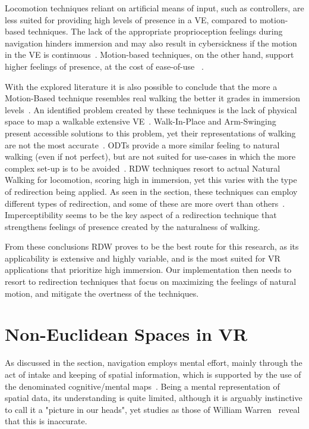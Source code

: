 Locomotion techniques reliant on artificial means of input, such as controllers, are less suited 
for providing high levels of presence in a \gls{VE}, compared to motion-based techniques. 
The lack of the appropriate proprioception feelings during navigation hinders 
immersion and may also result in cybersickness if the motion in the \gls{VE} is continuous~\cite{Langbehn2018, Nasiri2023}. 
Motion-based techniques, on the other hand, support higher feelings of presence, at the cost of ease-of-use 
~\cite{Boletsis2019, Cherni2020, 8255772, Nilsson2018, Syamil2024}. 

With the explored literature it is also possible to conclude that the more a Motion-Based technique resembles real walking the better it grades 
in immersion levels~\cite{Syamil2024}. An identified problem created by these techniques is the lack of physical space to map a walkable extensive 
\gls{VE}~\cite{Cherni2020, 8255772, Nilsson2018}. Walk-In-Place and Arm-Swinging present accessible solutions to
this problem, yet their representations of walking are not the most accurate~\cite{Cherni2020, Nilsson2018}. 
\glspl{ODT} provide a more similar feeling to natural walking (even if not perfect), 
but are not suited for use-cases in which the more complex set-up is to be avoided~\cite{Cherni2020,Syamil2024}. 
\gls{RDW} techniques resort to actual Natural Walking for locomotion, scoring high in immersion, yet this 
varies with the type of redirection being applied. As seen in the  section, these techniques can employ 
different types of redirection, and some of these are more overt than others~\cite{8255772, 6180877}. 
Imperceptibility seems to be the key aspect of a redirection technique that strengthens feelings of presence created 
by the naturalness of walking. 

From these conclusions \gls{RDW} proves to be the best route for this research, as its applicability is extensive and highly variable, and is the 
most suited for \gls{VR} applications that prioritize high immersion. Our implementation then needs to resort to redirection techniques that focus on maximizing 
the feelings of natural motion, and mitigate the overtness of the techniques.

\section{Non-Euclidean Spaces in VR}
\label{sec:non-euclidean-space}

As discussed in the  section, navigation employs mental effort, mainly through the 
act of intake and keeping of spatial information, which is supported by the use of the denominated cognitive/mental maps~\cite{Eastgate2014}. 
Being a mental representation of spatial data, its understanding is quite limited, although it is arguably instinctive to call it a 
"picture in our heads", yet studies as those of William Warren~\cite{Warren2019} reveal that this is inaccurate.

